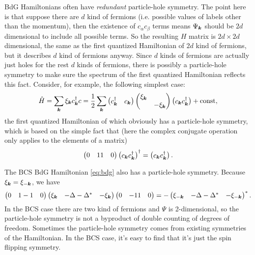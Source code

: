 \documentclass[hyperref, a4paper]{article}
\def\\{}%
\begin{document}
BdG Hamiltonians often have \emph{redundant} particle-hole symmetry. The point here is that suppose there are $d$ kind of fermions (i.e. 
possible values of labels other than the momentum), then the existence of $c_\alpha c_\beta$ terms means 
$\Psi_{\vb*{k}}$ should be $2d$ dimensional to include all possible terms. So the resulting $H$ matrix 
is $2d \times 2d$ dimensional, the same as the first quantized Hamiltonian of $2d$ kind of fermions,
but it describes $d$ kind of fermions anyway.
Since $d$ kinds of fermions are actually just holes for the rest $d$ kinds of fermions, 
there is possibly a particle-hole symmetry to make sure the spectrum of the first quantized Hamiltonian 
reflects this fact. Consider, for example, the following simplest case:
\begin{equation}
    \hat{H} = \sum_{\vb*{k}} \xi_{\vb*{k}} c^\dagger_{\vb*{k}} c = \frac{1}{2} \sum_{\vb*{k}} \pmqty{c^\dagger_{\vb*{k}} & c_{\vb*{k}} } \pmqty{\dmat{\xi_{\vb*{k}}, - \xi_{\vb*{k}}}} \pmqty{c_{\vb*{k}} \\ c^\dagger_{\vb*{k}}} + \text{const},
\end{equation}
the first quantized Hamiltonian of which obviously has a particle-hole symmetry, which is based on the simple 
fact that (here the complex conjugate operation only applies to the elements of a matrix)
\[
    \pmqty{0 & 1 \\ 1 & 0} \pmqty{c_{\vb*{k}} \\ c^\dagger_{\vb*{k}}}^\dagger = \pmqty{c_{\vb*{k}} \\ c^\dagger_{\vb*{k}}}.
\]

The BCS BdG Hamiltonian \eqref{eq:bdg} also has a particle-hole symmetry. Because $\xi_{\vb*{k}} = \xi_{- \vb*{k}}$, we have 
\begin{equation}
    \pmqty{0 & 1 \\ -1 & 0} \pmqty{\xi_{\vb*{k}} & - \Delta \\ - \Delta^* & - \xi_{\vb*{k}}} \pmqty{0 & -1 \\ 1 & 0} = - \pmqty{\xi_{- \vb*{k}} & - \Delta \\ - \Delta^* & - \xi_{- \vb*{k}}}^*.
\end{equation}
In the BCS case there are two kind of fermions and $\Psi$ is 2-dimensional, so the particle-hole symmetry is 
not a byproduct of double counting of degrees of freedom. 
Sometimes the particle-hole symmetry comes from existing symmetries of the Hamiltonian. In the 
BCS case, it's easy to find that it's just the spin flipping symmetry.
\end{document}
